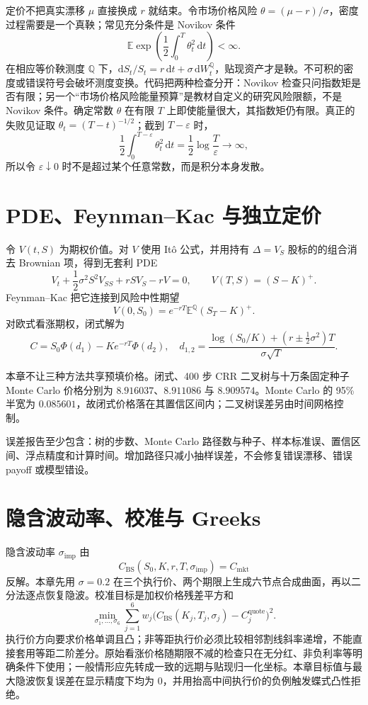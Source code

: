 定价不把真实漂移 $\mu$ 直接换成 $r$ 就结束。令市场价格风险 $\theta=(\mu-r)/\sigma$，密度过程需要是一个真鞅；常见充分条件是 Novikov 条件
\[
 \mathbb E\exp\!\left(\frac12\int_0^T\theta_t^2\,\mathrm dt\right)<\infty.
\]
在相应等价鞅测度 $\mathbb Q$ 下，$\mathrm dS_t/S_t=r\,\mathrm dt+\sigma\,\mathrm dW_t^{\mathbb Q}$，贴现资产才是鞅。不可积的密度或错误符号会破坏测度变换。代码把两种检查分开：Novikov 检查只问指数矩是否有限；另一个“市场价格风险能量预算”是教材自定义的研究风险限额，不是 Novikov 条件。确定常数 $\theta$ 在有限 $T$ 上即使能量很大，其指数矩仍有限。真正的失败见证取 $\theta_t=(T-t)^{-1/2}$；截到 $T-\varepsilon$ 时，
\[
\frac12\int_0^{T-\varepsilon}\theta_t^2\,\mathrm dt
=\frac12\log\frac{T}{\varepsilon}\longrightarrow\infty,
\]
所以令 $\varepsilon\downarrow0$ 时不是超过某个任意常数，而是积分本身发散。

\section{PDE、Feynman--Kac 与独立定价}

令 $V(t,S)$ 为期权价值。对 $V$ 使用 Itô 公式，并用持有 $\Delta=V_S$ 股标的的组合消去 Brownian 项，得到无套利 PDE
\[
 V_t+\frac12\sigma^2S^2V_{SS}+rSV_S-rV=0,
 \qquad V(T,S)=(S-K)^+.
\]
Feynman--Kac 把它连接到风险中性期望
\[
 V(0,S_0)=e^{-rT}\mathbb E^{\mathbb Q}(S_T-K)^+.
\]
对欧式看涨期权，闭式解为
\[
 C=S_0\Phi(d_1)-Ke^{-rT}\Phi(d_2),\quad
 d_{1,2}=\frac{\log(S_0/K)+(r\pm\tfrac12\sigma^2)T}{\sigma\sqrt T}.
\]

本章不让三种方法共享预填价格。闭式、400 步 CRR 二叉树与十万条固定种子 Monte Carlo 价格分别为 $8.916037$、$8.911086$ 与 $8.909574$。Monte Carlo 的 95\% 半宽为 $0.085601$，故闭式价格落在其置信区间内；二叉树误差另由时间网格控制。

误差报告至少包含：树的步数、Monte Carlo 路径数与种子、样本标准误、置信区间、浮点精度和计算时间。增加路径只减小抽样误差，不会修复错误漂移、错误 payoff 或模型错设。

\section{隐含波动率、校准与 Greeks}

隐含波动率 $\sigma_{\mathrm{imp}}$ 由
\[
 C_{\mathrm{BS}}(S_0,K,r,T,\sigma_{\mathrm{imp}})=C_{\mathrm{mkt}}
\]
反解。本章先用 $\sigma=0.2$ 在三个执行价、两个期限上生成六节点合成曲面，再以二分法逐点恢复隐波。校准目标是加权价格残差平方和
\[
 \min_{\sigma_1,\ldots,\sigma_6}\sum_{j=1}^{6}w_j\bigl(C_{\mathrm{BS}}(K_j,T_j,\sigma_j)-C_j^{\mathrm{quote}}\bigr)^2.
\]
执行价方向要求价格单调且凸；非等距执行价必须比较相邻割线斜率递增，不能直接套用等距二阶差分。原始看涨价格随期限不减的检查只在无分红、非负利率等明确条件下使用；一般情形应先转成一致的远期与贴现归一化坐标。本章目标值与最大隐波恢复误差在显示精度下均为 0，并用抬高中间执行价的负例触发蝶式凸性拒绝。

